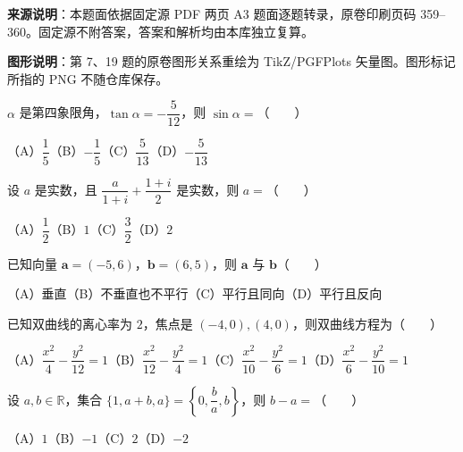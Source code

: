 


\begin{gktip}
\textbf{来源说明}：本题面依据固定源 PDF 两页 A3 题面逐题转录，原卷印刷页码 359–360。固定源不附答案，答案和解析均由本库独立复算。

\textbf{图形说明}：第 7、19 题的原卷图形关系重绘为 TikZ/PGFPlots 矢量图。图形标记所指的 PNG 不随仓库保存。
\end{gktip}


\begin{question}
$\alpha$ 是第四象限角，$\tan\alpha=-\dfrac5{12}$，则 $\sin\alpha=$\mbox{（　　）}

（A）$\dfrac15$\quad（B）$-\dfrac15$\quad（C）$\dfrac5{13}$\quad（D）$-\dfrac5{13}$

\end{question}
\begin{question}
设 $a$ 是实数，且 $\dfrac{a}{1+i}+\dfrac{1+i}{2}$ 是实数，则 $a=$\mbox{（　　）}

（A）$\dfrac12$\quad（B）$1$\quad（C）$\dfrac32$\quad（D）$2$

\end{question}
\begin{question}
已知向量 $\boldsymbol a=(-5,6)$，$\boldsymbol b=(6,5)$，则 $\boldsymbol a$ 与 $\boldsymbol b$\mbox{（　　）}

（A）垂直\quad（B）不垂直也不平行\quad（C）平行且同向\quad（D）平行且反向

\end{question}
\begin{question}
已知双曲线的离心率为 $2$，焦点是 $(-4,0),(4,0)$，则双曲线方程为\mbox{（　　）}

（A）$\dfrac{x^2}{4}-\dfrac{y^2}{12}=1$\quad（B）$\dfrac{x^2}{12}-\dfrac{y^2}{4}=1$\quad（C）$\dfrac{x^2}{10}-\dfrac{y^2}{6}=1$\quad（D）$\dfrac{x^2}{6}-\dfrac{y^2}{10}=1$

\end{question}
\begin{question}
设 $a,b\in\mathbb R$，集合 $\{1,a+b,a\}=\left\{0,\dfrac ba,b\right\}$，则 $b-a=$\mbox{（　　）}

（A）$1$\quad（B）$-1$\quad（C）$2$\quad（D）$-2$

\end{question}

